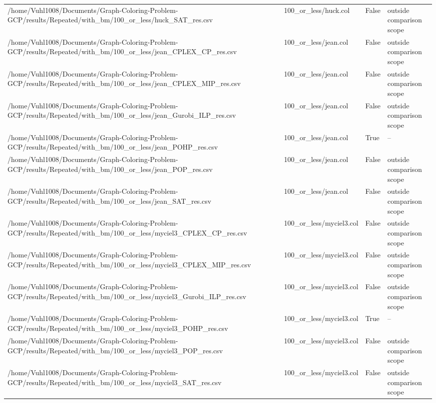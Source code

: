 \begin{table}[htbp]
\begin{tabular}{llll}
/home/Vuhl1008/Documents/Graph-Coloring-Problem-GCP/results/Repeated/with\_bm/100\_or\_less/huck\_SAT\_res.csv & 100\_or\_less/huck.col & False & outside comparison scope \\
/home/Vuhl1008/Documents/Graph-Coloring-Problem-GCP/results/Repeated/with\_bm/100\_or\_less/jean\_CPLEX\_CP\_res.csv & 100\_or\_less/jean.col & False & outside comparison scope \\
/home/Vuhl1008/Documents/Graph-Coloring-Problem-GCP/results/Repeated/with\_bm/100\_or\_less/jean\_CPLEX\_MIP\_res.csv & 100\_or\_less/jean.col & False & outside comparison scope \\
/home/Vuhl1008/Documents/Graph-Coloring-Problem-GCP/results/Repeated/with\_bm/100\_or\_less/jean\_Gurobi\_ILP\_res.csv & 100\_or\_less/jean.col & False & outside comparison scope \\
/home/Vuhl1008/Documents/Graph-Coloring-Problem-GCP/results/Repeated/with\_bm/100\_or\_less/jean\_POHP\_res.csv & 100\_or\_less/jean.col & True & -- \\
/home/Vuhl1008/Documents/Graph-Coloring-Problem-GCP/results/Repeated/with\_bm/100\_or\_less/jean\_POP\_res.csv & 100\_or\_less/jean.col & False & outside comparison scope \\
/home/Vuhl1008/Documents/Graph-Coloring-Problem-GCP/results/Repeated/with\_bm/100\_or\_less/jean\_SAT\_res.csv & 100\_or\_less/jean.col & False & outside comparison scope \\
/home/Vuhl1008/Documents/Graph-Coloring-Problem-GCP/results/Repeated/with\_bm/100\_or\_less/myciel3\_CPLEX\_CP\_res.csv & 100\_or\_less/myciel3.col & False & outside comparison scope \\
/home/Vuhl1008/Documents/Graph-Coloring-Problem-GCP/results/Repeated/with\_bm/100\_or\_less/myciel3\_CPLEX\_MIP\_res.csv & 100\_or\_less/myciel3.col & False & outside comparison scope \\
/home/Vuhl1008/Documents/Graph-Coloring-Problem-GCP/results/Repeated/with\_bm/100\_or\_less/myciel3\_Gurobi\_ILP\_res.csv & 100\_or\_less/myciel3.col & False & outside comparison scope \\
/home/Vuhl1008/Documents/Graph-Coloring-Problem-GCP/results/Repeated/with\_bm/100\_or\_less/myciel3\_POHP\_res.csv & 100\_or\_less/myciel3.col & True & -- \\
/home/Vuhl1008/Documents/Graph-Coloring-Problem-GCP/results/Repeated/with\_bm/100\_or\_less/myciel3\_POP\_res.csv & 100\_or\_less/myciel3.col & False & outside comparison scope \\
/home/Vuhl1008/Documents/Graph-Coloring-Problem-GCP/results/Repeated/with\_bm/100\_or\_less/myciel3\_SAT\_res.csv & 100\_or\_less/myciel3.col & False & outside comparison scope \\

\end{tabular}
\end{table}
